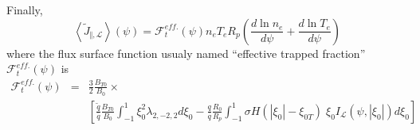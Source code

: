 Finally,
\begin{equation}
\left\langle \widetilde{J}_{\Vert ,\mathcal{L}}\right\rangle \left( \psi
\right) =\mathcal{F}_{t}^{eff.}\left( \psi \right) n_{e}T_{e}R_{p}\left(
\frac{d\ln n_{e}}{d\psi }+\frac{d\ln T_{e}}{d\psi }\right)
\end{equation}
where the flux surface function usualy named ``effective trapped fraction'' $%
\mathcal{F}_{t}^{eff.}\left( \psi \right) $ is
\begin{eqnarray}
\mathcal{F}_{t}^{eff.}\left( \psi \right)  &=&\frac{3}{2}\frac{B_{T0}}{B_{0}}%
\times   \nonumber \\
&&\left[ \frac{\widetilde{q}}{\overline{q}}\frac{B_{T0}}{B_{0}}%
\int_{-1}^{1}\xi _{0}^{2}\lambda _{2,-2,2}d\xi _{0}-\frac{q}{\overline{q}}%
\frac{R_{0}}{R_{p}}\int_{-1}^{1}\sigma H\left( \left| \xi
_{0}\right| -\xi _{0T}\right) \;\xi _{0}I_{\mathcal{L}}\left( \psi
,\left| \xi _{0}\right| \right) d\xi _{0}\right]\nonumber\\
\end{eqnarray}

